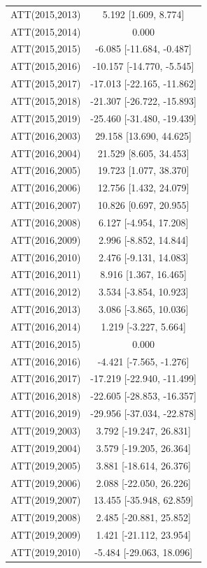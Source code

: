 \documentclass[
  12pt,
]{article}
\begin{document}
\begin{table}
\begin{tabular}[t]{lc}
ATT(2015,2013) & 5.192 [1.609, 8.774]\\
ATT(2015,2014) & 0.000\\
ATT(2015,2015) & -6.085 [-11.684, -0.487]\\
ATT(2015,2016) & -10.157 [-14.770, -5.545]\\
ATT(2015,2017) & -17.013 [-22.165, -11.862]\\
ATT(2015,2018) & -21.307 [-26.722, -15.893]\\
ATT(2015,2019) & -25.460 [-31.480, -19.439]\\
ATT(2016,2003) & 29.158 [13.690, 44.625]\\
ATT(2016,2004) & 21.529 [8.605, 34.453]\\
ATT(2016,2005) & 19.723 [1.077, 38.370]\\
ATT(2016,2006) & 12.756 [1.432, 24.079]\\
ATT(2016,2007) & 10.826 [0.697, 20.955]\\
ATT(2016,2008) & 6.127 [-4.954, 17.208]\\
ATT(2016,2009) & 2.996 [-8.852, 14.844]\\
ATT(2016,2010) & 2.476 [-9.131, 14.083]\\
ATT(2016,2011) & 8.916 [1.367, 16.465]\\
ATT(2016,2012) & 3.534 [-3.854, 10.923]\\
ATT(2016,2013) & 3.086 [-3.865, 10.036]\\
ATT(2016,2014) & 1.219 [-3.227, 5.664]\\
ATT(2016,2015) & 0.000\\
ATT(2016,2016) & -4.421 [-7.565, -1.276]\\
ATT(2016,2017) & -17.219 [-22.940, -11.499]\\
ATT(2016,2018) & -22.605 [-28.853, -16.357]\\
ATT(2016,2019) & -29.956 [-37.034, -22.878]\\
ATT(2019,2003) & 3.792 [-19.247, 26.831]\\
ATT(2019,2004) & 3.579 [-19.205, 26.364]\\
ATT(2019,2005) & 3.881 [-18.614, 26.376]\\
ATT(2019,2006) & 2.088 [-22.050, 26.226]\\
ATT(2019,2007) & 13.455 [-35.948, 62.859]\\
ATT(2019,2008) & 2.485 [-20.881, 25.852]\\
ATT(2019,2009) & 1.421 [-21.112, 23.954]\\
ATT(2019,2010) & -5.484 [-29.063, 18.096]\\

\end{tabular}
\end{table}
\end{document}
